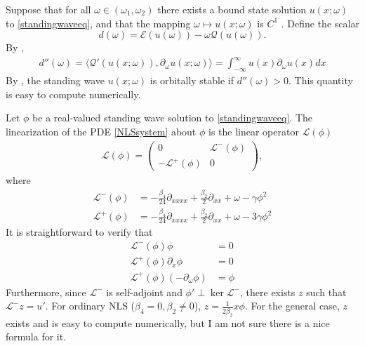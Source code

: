 \documentclass[12pt]{article}
\def\calE{{\mathcal E}}
\def\calQ{{\mathcal Q}}
\def\calL{{\mathcal L}}
\begin{document}
Suppose that for all $\omega \in (\omega_1, \omega_2)$ there exists a bound state solution $u(x; \omega)$ to \cref{standingwaveeq}, and that the mapping $\omega \mapsto u(x; \omega)$ is $C^1$ \cite[Assumption 2]{Grillakis1987}. Define the scalar
\begin{equation}
d(\omega) = \calE(u(\omega)) - \omega\calQ(u(\omega)).
\end{equation}
By \cite[(2.21)]{Grillakis1987},
\begin{align}\label{ddoubleprime}
d''(\omega) = \langle \calQ'(u(x; \omega)), \partial_\omega u(x; \omega) \rangle
= \int_{-\infty}^\infty u(x) \partial_\omega u(x) dx
\end{align}
By \cite[Theorem 3.5]{Grillakis1987}, the standing wave $u(x; \omega)$ is orbitally stable if $d''(\omega) > 0$. This quantity is easy to compute numerically.

Let $\phi$ be a real-valued standing wave solution to \cref{standingwaveeq}. The linearization of the PDE \cref{NLSsystem} about $\phi$ is the linear operator $\calL(\phi)$
\begin{align}\label{defLphi}
\calL(\phi) = 
\begin{pmatrix}
0 & \calL^-(\phi) \\
-\calL^+(\phi) & 0
\end{pmatrix},
\end{align}
where
\begin{align*}
\calL^-(\phi) &= -\frac{\beta_4}{24} \partial_{xxxx} + \frac{\beta_2}{2} \partial_{xx} + \omega - \gamma \phi^2 \\
\calL^+(\phi) &= -\frac{\beta_4}{24} \partial_{xxxx} + \frac{\beta_2}{2} \partial_{xx} + \omega - 3 \gamma \phi^2
\end{align*}
It is straightforward to verify that 
\begin{align*}
\calL^-(\phi) \phi &= 0 \\
\calL^+(\phi) \partial_x \phi &= 0 \\
\calL^+(\phi)(-\partial_\omega \phi) &= \phi
\end{align*}
Furthermore, since $\calL^-$ is self-adjoint and $\phi' \perp \ker \calL^-$, there exists $z$ such that $\calL^- z = u'$. For ordinary NLS ($\beta_4 = 0, \beta_2 \neq 0$), $z = \frac{1}{2 \beta_2} x \phi$. For the general case, $z$ exists and is easy to compute numerically, but I am not sure there is a nice formula for it.
\end{document}
